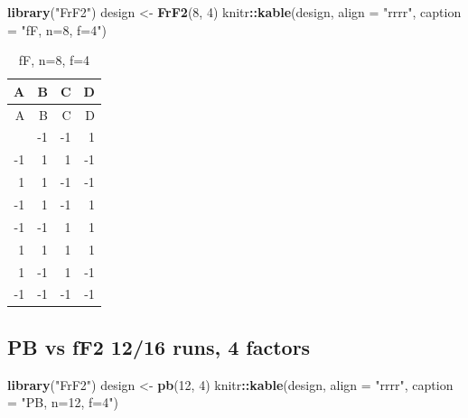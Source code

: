 \documentclass[
  12pt,
  a4paper,
]{article}
\newenvironment{Shaded}{\begin{snugshade}}{\end{snugshade}}
\newcommand{\AttributeTok}[1]{\textcolor[rgb]{0.13,0.29,0.53}{#1}}
\newcommand{\DecValTok}[1]{\textcolor[rgb]{0.00,0.00,0.81}{#1}}
\newcommand{\FunctionTok}[1]{\textcolor[rgb]{0.13,0.29,0.53}{\textbf{#1}}}
\newcommand{\NormalTok}[1]{#1}
\newcommand{\OtherTok}[1]{\textcolor[rgb]{0.56,0.35,0.01}{#1}}
\newcommand{\SpecialCharTok}[1]{\textcolor[rgb]{0.81,0.36,0.00}{\textbf{#1}}}
\newcommand{\StringTok}[1]{\textcolor[rgb]{0.31,0.60,0.02}{#1}}
\numberwithin{equation}{section}
\theoremstyle{plain}
\theoremstyle{definition}
\theoremstyle{remark}
\theoremstyle{note}
\begin{document}
\begin{Shaded}
\begin{Highlighting}[]
\FunctionTok{library}\NormalTok{(}\StringTok{"FrF2"}\NormalTok{)}
\NormalTok{design }\OtherTok{\textless{}{-}} \FunctionTok{FrF2}\NormalTok{(}\DecValTok{8}\NormalTok{, }\DecValTok{4}\NormalTok{)}
\NormalTok{knitr}\SpecialCharTok{::}\FunctionTok{kable}\NormalTok{(design, }\AttributeTok{align =} \StringTok{"rrrr"}\NormalTok{, }\AttributeTok{caption =} \StringTok{"fF, n=8, f=4"}\NormalTok{)}
\end{Highlighting}
\end{Shaded}

\begin{longtable}[]{@{}rrrr@{}}
\caption{fF, n=8, f=4}\tabularnewline
\toprule\noalign{}
A & B & C & D \\
\midrule\noalign{}
\endfirsthead
\toprule\noalign{}
A & B & C & D \\
\midrule\noalign{}
\endhead
\bottomrule\noalign{}
\endlastfoot
1 & -1 & -1 & 1 \\
-1 & 1 & 1 & -1 \\
1 & 1 & -1 & -1 \\
-1 & 1 & -1 & 1 \\
-1 & -1 & 1 & 1 \\
1 & 1 & 1 & 1 \\
1 & -1 & 1 & -1 \\
-1 & -1 & -1 & -1 \\
\end{longtable}

\newpage

\hypertarget{pb-vs-ff2-1216-runs-4-factors}{%
\subsection{PB vs fF2 12/16 runs, 4
factors}\label{pb-vs-ff2-1216-runs-4-factors}}

\begin{Shaded}
\begin{Highlighting}[]
\FunctionTok{library}\NormalTok{(}\StringTok{"FrF2"}\NormalTok{)}
\NormalTok{design }\OtherTok{\textless{}{-}} \FunctionTok{pb}\NormalTok{(}\DecValTok{12}\NormalTok{, }\DecValTok{4}\NormalTok{)}
\NormalTok{knitr}\SpecialCharTok{::}\FunctionTok{kable}\NormalTok{(design, }\AttributeTok{align =} \StringTok{"rrrr"}\NormalTok{, }\AttributeTok{caption =} \StringTok{"PB, n=12, f=4"}\NormalTok{)}
\end{Highlighting}
\end{Shaded}
\end{document}
